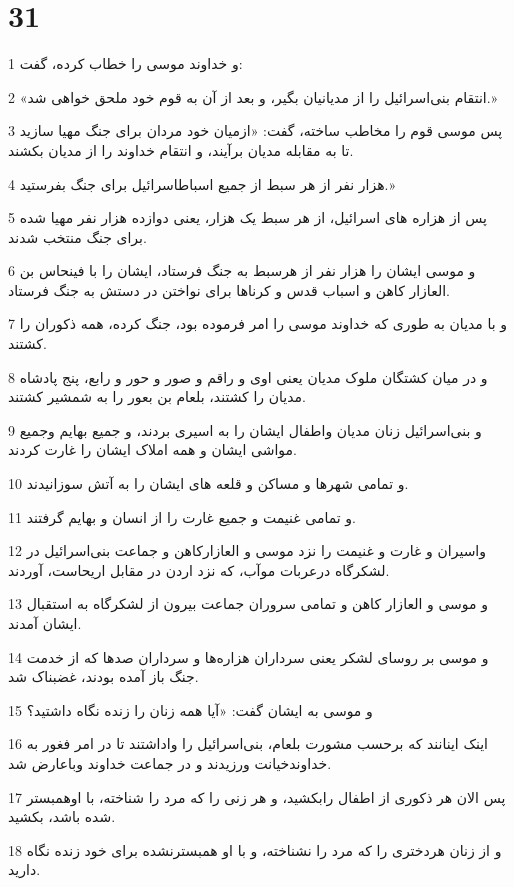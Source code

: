 \chapter{31}

\par 1 و خداوند موسی را خطاب کرده، گفت:
\par 2 «انتقام بنی‌اسرائیل را از مدیانیان بگیر، و بعد از آن به قوم خود ملحق خواهی شد.»
\par 3 پس موسی قوم را مخاطب ساخته، گفت: «ازمیان خود مردان برای جنگ مهیا سازید تا به مقابله مدیان برآیند، و انتقام خداوند را از مدیان بکشند.
\par 4 هزار نفر از هر سبط از جمیع اسباطاسرائیل برای جنگ بفرستید.»
\par 5 پس از هزاره های اسرائیل، از هر سبط یک هزار، یعنی دوازده هزار نفر مهیا شده برای جنگ منتخب شدند.
\par 6 و موسی ایشان را هزار نفر از هرسبط به جنگ فرستاد، ایشان را با فینحاس بن العازار کاهن و اسباب قدس و کرناها برای نواختن در دستش به جنگ فرستاد.
\par 7 و با مدیان به طوری که خداوند موسی را امر فرموده بود، جنگ کرده، همه ذکوران را کشتند.
\par 8 و در میان کشتگان ملوک مدیان یعنی اوی و راقم و صور و حور و رابع، پنج پادشاه مدیان را کشتند، بلعام بن بعور را به شمشیر کشتند.
\par 9 و بنی‌اسرائیل زنان مدیان واطفال ایشان را به اسیری بردند، و جمیع بهایم وجمیع مواشی ایشان و همه املاک ایشان را غارت کردند.
\par 10 و تمامی شهرها و مساکن و قلعه های ایشان را به آتش سوزانیدند.
\par 11 و تمامی غنیمت و جمیع غارت را از انسان و بهایم گرفتند.
\par 12 واسیران و غارت و غنیمت را نزد موسی و العازارکاهن و جماعت بنی‌اسرائیل در لشکرگاه درعربات موآب، که نزد اردن در مقابل اریحاست، آوردند.
\par 13 و موسی و العازار کاهن و تمامی سروران جماعت بیرون از لشکرگاه به استقبال ایشان آمدند.
\par 14 و موسی بر روسای لشکر یعنی سرداران هزاره‌ها و سرداران صدها که از خدمت جنگ باز آمده بودند، غضبناک شد.
\par 15 و موسی به ایشان گفت: «آیا همه زنان را زنده نگاه داشتید؟
\par 16 اینک اینانند که برحسب مشورت بلعام، بنی‌اسرائیل را واداشتند تا در امر فغور به خداوندخیانت ورزیدند و در جماعت خداوند وباعارض شد.
\par 17 پس الان هر ذکوری از اطفال رابکشید، و هر زنی را که مرد را شناخته، با اوهمبستر شده باشد، بکشید.
\par 18 و از زنان هردختری را که مرد را نشناخته، و با او همبسترنشده برای خود زنده نگاه دارید.
